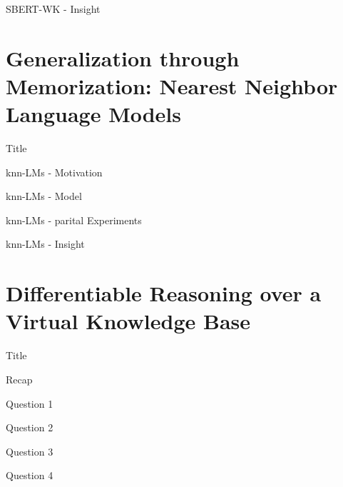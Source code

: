 \documentclass[10pt]{beamer}
\begin{document}
\begin{frame}{SBERT-WK - Insight}

\end{frame}

\section{Generalization through Memorization: Nearest Neighbor Language Models}

\begin{frame}{Title}
    
\end{frame}

\begin{frame}{knn-LMs - Motivation}

\end{frame}

\begin{frame}{knn-LMs - Model}

\end{frame}

\begin{frame}{knn-LMs - parital Experiments}

\end{frame}

\begin{frame}{knn-LMs - Insight}

\end{frame}

\section{Differentiable Reasoning over a Virtual Knowledge Base}

\begin{frame}{Title}
    
\end{frame}

\begin{frame}{Recap}
    
\end{frame}

\begin{frame}{Question 1}

\end{frame}

\begin{frame}{Question 2}

\end{frame}

\begin{frame}{Question 3}

\end{frame}

\begin{frame}{Question 4}

\end{frame}
\end{document}
